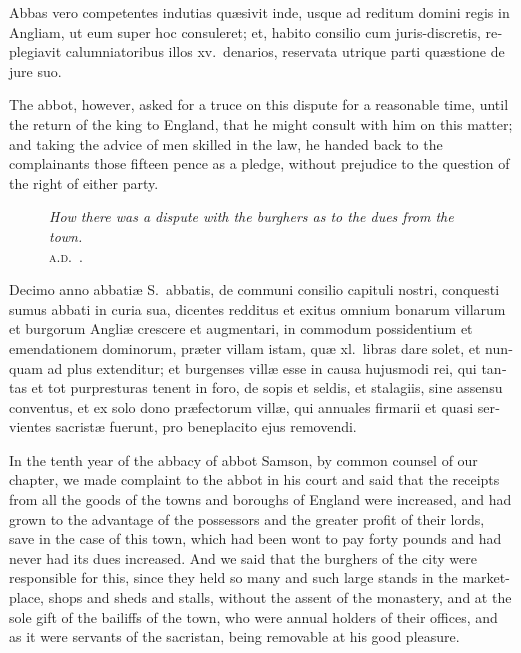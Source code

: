 \documentclass{book}
\newcommand{\blockhead}[4][]{
\begin{figure}
\centering
\vspace{#4}
\parbox{2.75cm}{\begin{center}\footnotesize \color{BrickRed} \emph{#2}\\ #1 \end{center}}
\end{figure}
}
\begin{document}
\begin{paracol}{2}
\switchcolumn*

\begin{otherlanguage}{latin}
Abbas vero competentes indutias qu\ae{}sivit inde, usque ad reditum domini regis in Angliam, ut eum super hoc consuleret; et, habito consilio cum juris-discretis, replegiavit calumniatoribus illos xv.\ denarios, reservata utrique parti qu\ae{}stione de jure suo.
\end{otherlanguage}

\switchcolumn

The abbot, however, asked for a truce on this dispute for a reasonable time, until the return of the king to England, that he might consult with him on this matter; and taking the advice of men skilled in the law, he handed back to the complainants those fifteen pence as a pledge, without prejudice to the question of the right of either party.

\switchcolumn*

\begin{otherlanguage}{latin}
\blockhead[\textsc{a.d}.\ .]{How there was a dispute with the burghers as to the dues from the town.}{4}{-.65cm}
Decimo anno abbati\ae{} S.\ abbatis, de communi consilio capituli nostri, conquesti sumus abbati in curia sua, dicentes redditus et exitus omnium bonarum villarum et burgorum Angli\ae{} crescere et augmentari, in commodum possidentium et emendationem dominorum, pr\ae{}ter villam istam, qu\ae{} xl.\ libras dare solet, et nunquam ad plus extenditur; et burgenses vill\ae{} esse in causa hujusmodi rei, qui tantas et tot purpresturas tenent in foro, de sopis et seldis, et stalagiis, sine assensu conventus, et ex solo dono pr\ae{}fectorum vill\ae{}, qui annuales firmarii et quasi servientes sacrist\ae{} fuerunt, pro beneplacito ejus removendi. 

\end{otherlanguage}

\switchcolumn

In the tenth year of the abbacy of abbot Samson, by common counsel of our chapter, we made complaint to the abbot in his court and said that the receipts from all the goods of the towns and boroughs of England were increased, and had grown to the advantage of the possessors and the greater profit of their lords, save in the case of this town, which had been wont to pay forty pounds and had never had its dues increased. And we said that the burghers of the city were responsible for this, since they held so many and such large stands in the market-place, shops and sheds and stalls, without the assent of the monastery, and at the sole gift of the bailiffs of the town, who were annual holders of their offices, and as it were servants of the sacristan, being removable at his good pleasure.


\end{paracol}
\end{document}
